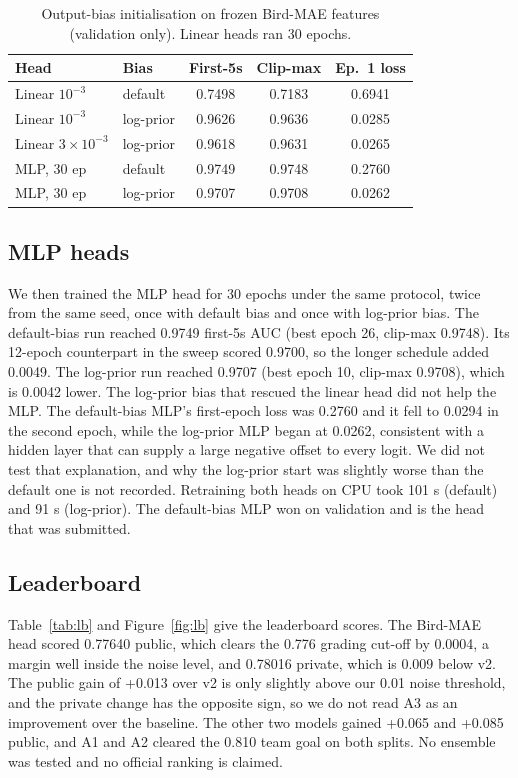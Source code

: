 \documentclass[letterpaper]{article} %
\begin{document}
\begin{table}[t]
\centering
\small
\begin{tabular}{llccc}
\toprule
Head & Bias & First-5s & Clip-max & Ep.~1 loss \\
\midrule
Linear $10^{-3}$ & default & 0.7498 & 0.7183 & 0.6941 \\
Linear $10^{-3}$ & log-prior & 0.9626 & 0.9636 & 0.0285 \\
Linear $3\times10^{-3}$ & log-prior & 0.9618 & 0.9631 & 0.0265 \\
MLP, 30 ep & default & 0.9749 & 0.9748 & 0.2760 \\
MLP, 30 ep & log-prior & 0.9707 & 0.9708 & 0.0262 \\
\bottomrule
\end{tabular}
\caption{Output-bias initialisation on frozen Bird-MAE features (validation only). Linear heads ran 30 epochs.}
\label{tab:bias}
\end{table}

\subsection{MLP heads}
We then trained the MLP head for 30 epochs under the same protocol, twice from the same seed, once with default bias and once with log-prior bias. The default-bias run reached 0.9749 first-5s AUC (best epoch 26, clip-max 0.9748). Its 12-epoch counterpart in the sweep scored 0.9700, so the longer schedule added 0.0049. The log-prior run reached 0.9707 (best epoch 10, clip-max 0.9708), which is 0.0042 lower. The log-prior bias that rescued the linear head did not help the MLP. The default-bias MLP's first-epoch loss was 0.2760 and it fell to 0.0294 in the second epoch, while the log-prior MLP began at 0.0262, consistent with a hidden layer that can supply a large negative offset to every logit. We did not test that explanation, and why the log-prior start was slightly worse than the default one is not recorded. Retraining both heads on CPU took 101 s (default) and 91 s (log-prior). The default-bias MLP won on validation and is the head that was submitted.

\subsection{Leaderboard}
Table~\ref{tab:lb} and Figure~\ref{fig:lb} give the leaderboard scores. The Bird-MAE head scored 0.77640 public, which clears the 0.776 grading cut-off by 0.0004, a margin well inside the noise level, and 0.78016 private, which is 0.009 below v2. The public gain of +0.013 over v2 is only slightly above our 0.01 noise threshold, and the private change has the opposite sign, so we do not read A3 as an improvement over the baseline. The other two models gained +0.065 and +0.085 public, and A1 and A2 cleared the 0.810 team goal on both splits. No ensemble was tested and no official ranking is claimed.
\end{document}
